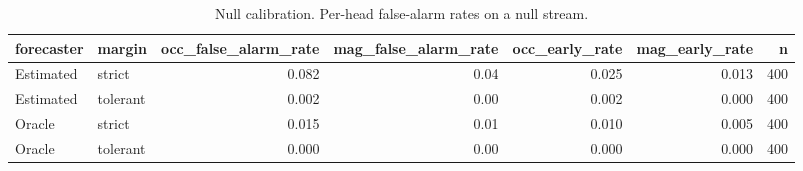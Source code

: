 \begin{table}

\caption{Null calibration. Per-head false-alarm rates on a null stream.}
\centering
\begin{tabular}[t]{llrrrrr}
\toprule
forecaster & margin & occ\_false\_alarm\_rate & mag\_false\_alarm\_rate & occ\_early\_rate & mag\_early\_rate & n\\
\midrule
Estimated & strict & 0.082 & 0.04 & 0.025 & 0.013 & 400\\
Estimated & tolerant & 0.002 & 0.00 & 0.002 & 0.000 & 400\\
Oracle & strict & 0.015 & 0.01 & 0.010 & 0.005 & 400\\
Oracle & tolerant & 0.000 & 0.00 & 0.000 & 0.000 & 400\\
\bottomrule
\end{tabular}
\end{table}
